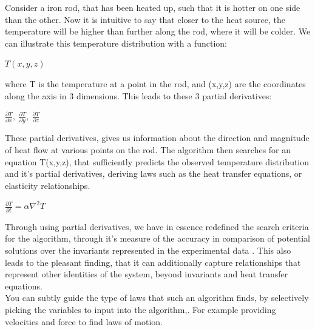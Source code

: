 \documentclass{article}
\begin{document}
Consider a iron rod, that has been heated up, such that it is hotter on one side than the other. Now it is intuitive to say that closer to the heat source, the temperature will be higher than further along the rod, where it will be colder. We can illustrate this temperature distribution with a function:  \\

\begin{center}
$T(x,y,z)$
\end{center}

where T is the temperature at a point in the rod, and (x,y,z) are the coordinates along the axis in 3 dimensions. This leads to these 3 partial derivatives: \\ 

\begin{center}
 $\frac{\partial T}{\partial x}, \  \frac{\partial T}{\partial y}, \  \frac{\partial T}{\partial z}$
\end{center}

These partial derivatives, gives us information about the direction and magnitude of heat flow at various points on the rod. The algorithm then searches for an equation T(x,y,z), that sufficiently predicts the observed temperature distribution and it's partial derivatives, deriving laws such as the heat transfer equations, or elasticity relationships.\\ 

\begin{center}
$\frac{\partial T}{\partial t} = \alpha \nabla^2 T$
\end{center}



Through using partial derivatives, we have in essence redefined the search criteria for the algorithm, through it's measure of the accuracy in comparison of potential solutions over the invariants represented in the experimental data \cite{Kelly2021} . This also leads to the pleasant finding, that it can additionally capture relationships that represent other identities of the system, beyond invariants and heat transfer equations. \\ 

You can subtly guide the type of laws that such an algorithm finds, by selectively picking the variables to input into the algorithm,. For example providing velocities and force to find laws of motion. \\ 
\end{document}
